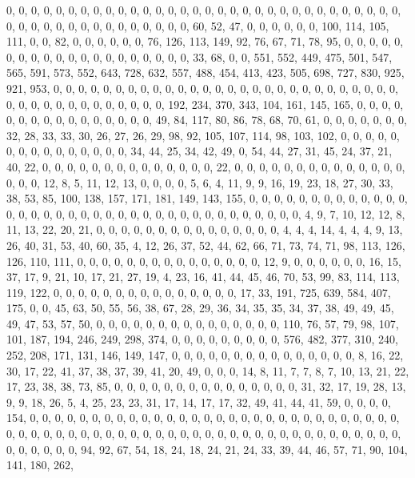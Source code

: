 \documentclass[
]{article}
\begin{document}
0, 0, 0, 0, 0, 0, 0, 0, 0, 0, 0, 0, 0, 0, 0, 0, 0, 0, 0, 0, 0, 0, 0, 0,
0, 0, 0, 0, 0, 0, 0, 0, 0, 0, 0, 0, 0, 0, 0, 0, 0, 0, 0, 0, 0, 0, 0, 60,
52, 47, 0, 0, 0, 0, 0, 0, 100, 114, 105, 111, 0, 0, 82, 0, 0, 0, 0, 0,
0, 76, 126, 113, 149, 92, 76, 67, 71, 78, 95, 0, 0, 0, 0, 0, 0, 0, 0, 0,
0, 0, 0, 0, 0, 0, 0, 0, 0, 0, 0, 33, 68, 0, 0, 551, 552, 449, 475, 501,
547, 565, 591, 573, 552, 643, 728, 632, 557, 488, 454, 413, 423, 505,
698, 727, 830, 925, 921, 953, 0, 0, 0, 0, 0, 0, 0, 0, 0, 0, 0, 0, 0, 0,
0, 0, 0, 0, 0, 0, 0, 0, 0, 0, 0, 0, 0, 0, 0, 0, 0, 0, 0, 0, 0, 0, 0, 0,
0, 0, 0, 192, 234, 370, 343, 104, 161, 145, 165, 0, 0, 0, 0, 0, 0, 0, 0,
0, 0, 0, 0, 0, 0, 0, 0, 49, 84, 117, 80, 86, 78, 68, 70, 61, 0, 0, 0, 0,
0, 0, 0, 32, 28, 33, 33, 30, 26, 27, 26, 29, 98, 92, 105, 107, 114, 98,
103, 102, 0, 0, 0, 0, 0, 0, 0, 0, 0, 0, 0, 0, 0, 0, 0, 34, 44, 25, 34,
42, 49, 0, 54, 44, 27, 31, 45, 24, 37, 21, 40, 22, 0, 0, 0, 0, 0, 0, 0,
0, 0, 0, 0, 0, 0, 0, 22, 0, 0, 0, 0, 0, 0, 0, 0, 0, 0, 0, 0, 0, 0, 0, 0,
0, 12, 8, 5, 11, 12, 13, 0, 0, 0, 0, 5, 6, 4, 11, 9, 9, 16, 19, 23, 18,
27, 30, 33, 38, 53, 85, 100, 138, 157, 171, 181, 149, 143, 155, 0, 0, 0,
0, 0, 0, 0, 0, 0, 0, 0, 0, 0, 0, 0, 0, 0, 0, 0, 0, 0, 0, 0, 0, 0, 0, 0,
0, 0, 0, 0, 0, 0, 0, 0, 0, 0, 4, 9, 7, 10, 12, 12, 8, 11, 13, 22, 20,
21, 0, 0, 0, 0, 0, 0, 0, 0, 0, 0, 0, 0, 0, 0, 0, 4, 4, 4, 14, 4, 4, 4,
9, 13, 26, 40, 31, 53, 40, 60, 35, 4, 12, 26, 37, 52, 44, 62, 66, 71,
73, 74, 71, 98, 113, 126, 126, 110, 111, 0, 0, 0, 0, 0, 0, 0, 0, 0, 0,
0, 0, 0, 0, 0, 12, 9, 0, 0, 0, 0, 0, 0, 16, 15, 37, 17, 9, 21, 10, 17,
21, 27, 19, 4, 23, 16, 41, 44, 45, 46, 70, 53, 99, 83, 114, 113, 119,
122, 0, 0, 0, 0, 0, 0, 0, 0, 0, 0, 0, 0, 0, 0, 0, 17, 33, 191, 725, 639,
584, 407, 175, 0, 0, 45, 63, 50, 55, 56, 38, 67, 28, 29, 36, 34, 35, 35,
34, 37, 38, 49, 49, 45, 49, 47, 53, 57, 50, 0, 0, 0, 0, 0, 0, 0, 0, 0,
0, 0, 0, 0, 0, 0, 110, 76, 57, 79, 98, 107, 101, 187, 194, 246, 249,
298, 374, 0, 0, 0, 0, 0, 0, 0, 0, 0, 576, 482, 377, 310, 240, 252, 208,
171, 131, 146, 149, 147, 0, 0, 0, 0, 0, 0, 0, 0, 0, 0, 0, 0, 0, 0, 0, 8,
16, 22, 30, 17, 22, 41, 37, 38, 37, 39, 41, 20, 49, 0, 0, 0, 14, 8, 11,
7, 7, 8, 7, 10, 13, 21, 22, 17, 23, 38, 38, 73, 85, 0, 0, 0, 0, 0, 0, 0,
0, 0, 0, 0, 0, 0, 0, 0, 31, 32, 17, 19, 28, 13, 9, 9, 18, 26, 5, 4, 25,
23, 23, 31, 17, 14, 17, 17, 32, 49, 41, 44, 41, 59, 0, 0, 0, 0, 154, 0,
0, 0, 0, 0, 0, 0, 0, 0, 0, 0, 0, 0, 0, 0, 0, 0, 0, 0, 0, 0, 0, 0, 0, 0,
0, 0, 0, 0, 0, 0, 0, 0, 0, 0, 0, 0, 0, 0, 0, 0, 0, 0, 0, 0, 0, 0, 0, 0,
0, 0, 0, 0, 0, 0, 0, 0, 0, 0, 0, 0, 0, 0, 0, 0, 0, 0, 0, 94, 92, 67, 54,
18, 24, 18, 24, 21, 24, 33, 39, 44, 46, 57, 71, 90, 104, 141, 180, 262,
\end{document}

